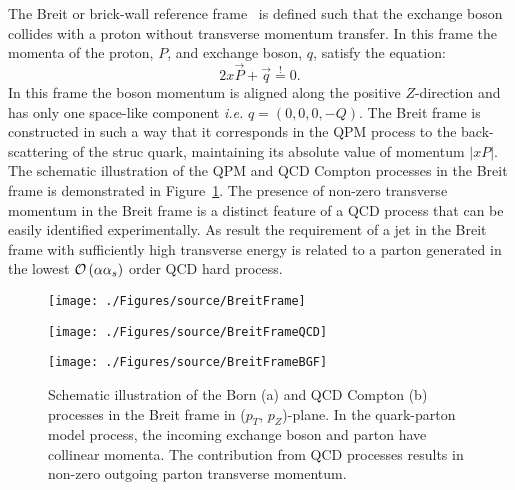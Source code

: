 The Breit or brick-wall reference frame~\cite{feynman:1972:photon,zfp:c2:237} is defined such that the exchange boson collides with a proton without transverse momentum transfer. In this frame the momenta of the proton, $P$, and exchange boson, $q$, satisfy the equation:
\begin{equation}
2x\vec{P} + \vec{q} \stackrel{!}{=} 0.
\label{eq:breitframe}
\end{equation}
In this frame the boson momentum is aligned along the positive $Z$-direction and has only one space-like component \textit{i.e.} $q=\left( 0, 0, 0, -Q\right)$. The Breit frame is constructed in such a way that it corresponds in the QPM process to the back-scattering of the struc quark, maintaining its absolute value of momentum $\left|xP\right|$. The schematic illustration of the QPM and QCD Compton processes in the Breit frame is demonstrated in Figure~\ref{fig:breitframe}. The presence of non-zero transverse momentum in the Breit frame is a distinct feature of a QCD process that can be easily identified experimentally. As result the requirement of a jet in the Breit frame with sufficiently high transverse energy is related to a parton generated in the lowest $\mathcal{O}\left(\alpha\mbox{$\alpha_{s}$}\right)$ order QCD hard process.
\begin{figure}
	\centering
	\begin{subfloat}[]{
		\texttt{[image: ./Figures/source/BreitFrame]}
		\label{fig:breitframeqpm}
	}%
	\end{subfloat}
	\begin{subfloat}[]{
		\texttt{[image: ./Figures/source/BreitFrameQCD]}
		\label{fig:breitframeqcd}
	}%
	\end{subfloat}
	\begin{subfloat}[]{
		\texttt{[image: ./Figures/source/BreitFrameBGF]}
		\label{fig:breitframeqcd}
	}%
	\end{subfloat}
	\caption{Schematic illustration of the Born (a) and QCD Compton (b) processes in the Breit frame in ($p_T$, $p_Z$)-plane. In the quark-parton model process, the incoming exchange boson and parton have collinear momenta. The contribution from QCD processes results in non-zero outgoing parton transverse momentum.}
\label{fig:breitframe}
\end{figure}